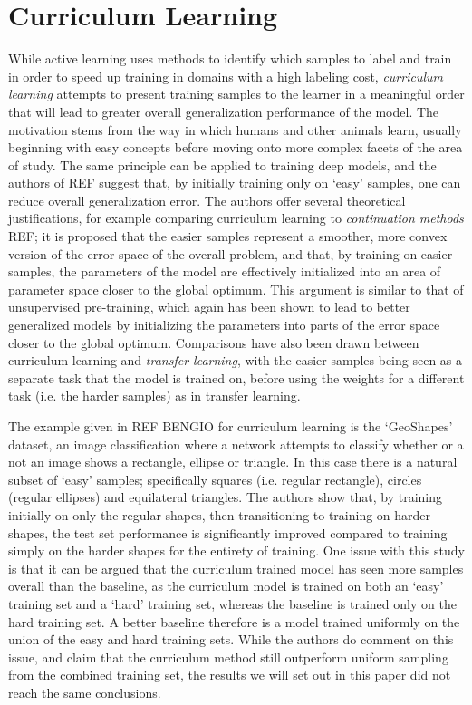 \section{Curriculum Learning}
While active learning uses methods to identify which samples to label and train in order to speed up training in domains with a high labeling cost, \textit{curriculum learning} attempts to present training samples to the learner in a meaningful order that will lead to greater overall generalization performance of the model. The motivation stems from the way in which humans and other animals  learn, usually beginning with easy concepts before moving onto more complex facets of the area of study. The same principle can be applied to training deep models, and the authors of REF suggest that, by initially training only on `easy' samples, one can reduce overall generalization error. The authors offer several theoretical justifications, for example comparing curriculum learning to \textit{continuation methods} REF;  it is proposed that the easier samples represent a smoother, more convex version of the error space of the overall problem, and that, by training on easier samples, the parameters of the model are effectively initialized into an area of parameter space closer to the global optimum. This argument is similar to that of unsupervised pre-training, which again has been shown to lead to better generalized models by initializing the parameters into parts of the error space closer to the global optimum. Comparisons have also been drawn between curriculum learning and \textit{transfer learning}, with the easier samples being seen as a separate task that the model is trained on, before using the weights for a different task (i.e. the harder samples) as in transfer learning.  

The example given in REF BENGIO  for curriculum learning is the `GeoShapes' dataset, an image classification where a network attempts to classify whether or a not an image shows a rectangle, ellipse or triangle. In this case there is a natural subset of `easy' samples; specifically squares (i.e. regular rectangle), circles (regular ellipses) and equilateral triangles. The authors show that, by training initially on only the regular shapes, then transitioning to training on harder shapes, the test set performance is significantly improved compared to training simply on the harder shapes for the entirety of training. One issue with this study is that it can be argued that the curriculum trained model has seen more samples overall than the baseline, as the curriculum model is trained on both an `easy' training set and a `hard' training set, whereas the baseline is trained only on the hard training set. A better baseline therefore is a model trained uniformly on the union of the easy and hard training sets. While the authors do comment on this issue, and claim that the curriculum method still outperform uniform sampling from the combined training set, the results we will set out in this paper did not reach the same conclusions. 

